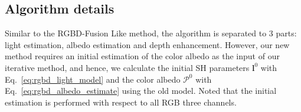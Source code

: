 
\subsection{Algorithm details}
Similar to the RGBD-Fusion Like method, the algorithm is separated to 3 parts: light estimation, albedo estimation and depth enhancement.
However, our new method requires an initial estimation of the color albedo as the input of our iterative method, and hence, we calculate the initial SH parameters $\mathbf{l}^{0}$ with Eq.~\ref{eq:rgbd_light_model} and the color albedo $\mathcal{P}^{0}$ with Eq.~\ref{eq:rgbd_albedo_estimate} using the old model.
Noted that the initial estimation is performed with respect to all RGB three channels.

